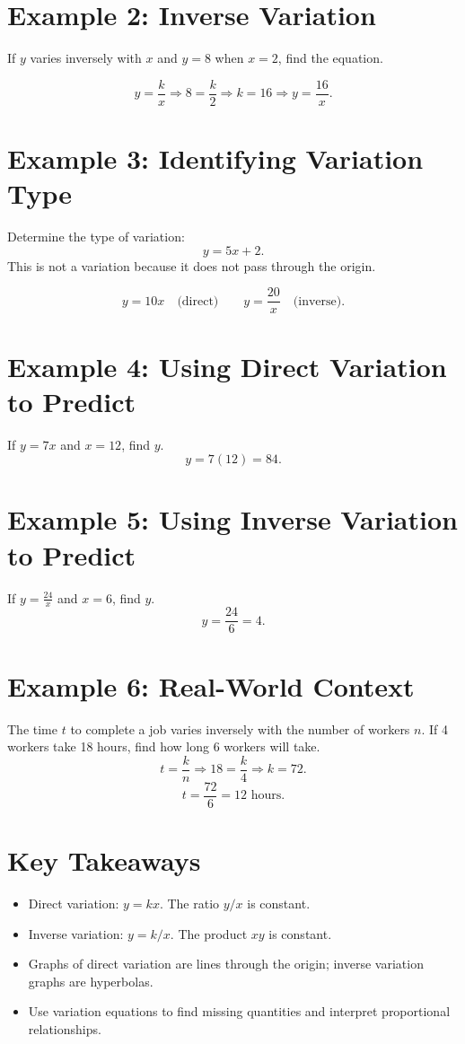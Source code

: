 \documentclass[14pt]{extarticle}
\begin{document}
\section*{Example 2: Inverse Variation}

If \(y\) varies inversely with \(x\) and \(y=8\) when \(x=2\), find the equation.

\[
y = \frac{k}{x} \Rightarrow 8 = \frac{k}{2} \Rightarrow k = 16 \Rightarrow \boxed{y = \frac{16}{x}}.
\]

\section*{Example 3: Identifying Variation Type}

Determine the type of variation:
\[
y = 5x + 2.
\]
This is not a variation because it does not pass through the origin.

\[
y = 10x \quad \text{(direct)} \qquad y = \frac{20}{x} \quad \text{(inverse)}.
\]

\section*{Example 4: Using Direct Variation to Predict}

If \(y = 7x\) and \(x=12\), find \(y\).
\[
y = 7(12) = \boxed{84}.
\]

\section*{Example 5: Using Inverse Variation to Predict}

If \(y = \frac{24}{x}\) and \(x=6\), find \(y\).
\[
y = \frac{24}{6} = \boxed{4}.
\]

\section*{Example 6: Real-World Context}

The time \(t\) to complete a job varies inversely with the number of workers \(n\).  
If 4 workers take 18 hours, find how long 6 workers will take.
\[
t = \frac{k}{n} \Rightarrow 18 = \frac{k}{4} \Rightarrow k = 72.
\]
\[
t = \frac{72}{6} = \boxed{12\text{ hours}}.
\]

\section*{Key Takeaways}
\begin{itemize}
  \item Direct variation: \(y = kx\). The ratio \(y/x\) is constant.
  \item Inverse variation: \(y = k/x\). The product \(xy\) is constant.
  \item Graphs of direct variation are lines through the origin; inverse variation graphs are hyperbolas.
  \item Use variation equations to find missing quantities and interpret proportional relationships.
\end{itemize}
\end{document}
